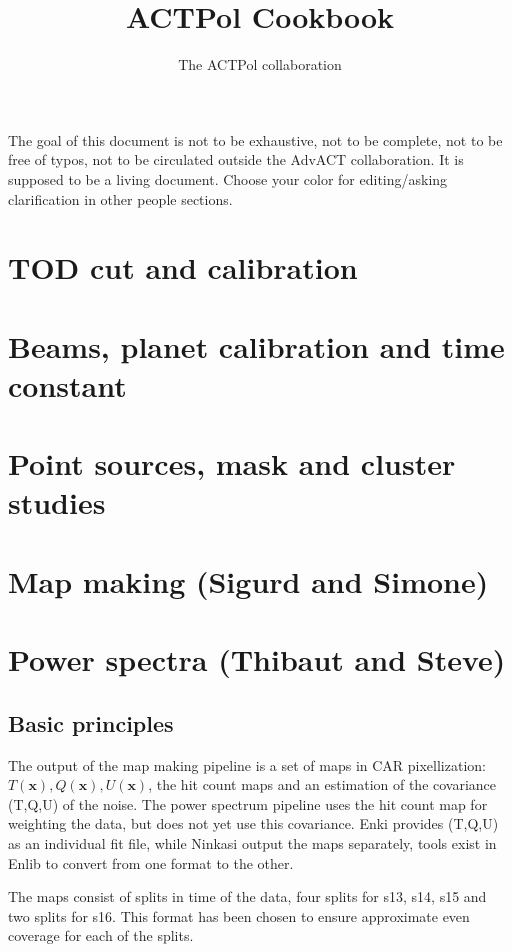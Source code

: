 \documentclass[a4paper, 11pt]{article}
\begin{document}
\title{\textbf{ACTPol Cookbook}}
\author{The ACTPol collaboration}
\maketitle

The goal of this document is not to be exhaustive, not to be complete, not to be free of typos, not to be circulated outside the AdvACT collaboration. It is supposed to be a living document.
Choose your color for editing/asking clarification in other people sections. 

\section{TOD cut and calibration}

\section{Beams, planet calibration and time constant}

\section{Point sources, mask and cluster studies}


\section{Map making (Sigurd and Simone)}

\section{Power spectra (Thibaut and Steve)}

\subsection{Basic principles}

The output of the map making pipeline is a set of maps in CAR pixellization: $T(\bm{x}), Q(\bm{x}), U(\bm{x})$, the hit count maps and an estimation of the covariance (T,Q,U) of the noise. The power spectrum pipeline uses the hit count map for weighting the data, but  does not yet use this covariance.
Enki provides (T,Q,U) as an individual fit file, while Ninkasi output the maps separately, tools exist in Enlib to convert from one format to the other. 

The maps consist of splits in time of the data, four splits for s13, s14, s15 and two splits for s16. This format has been chosen to ensure  approximate even coverage for each of the splits. 
\end{document}
